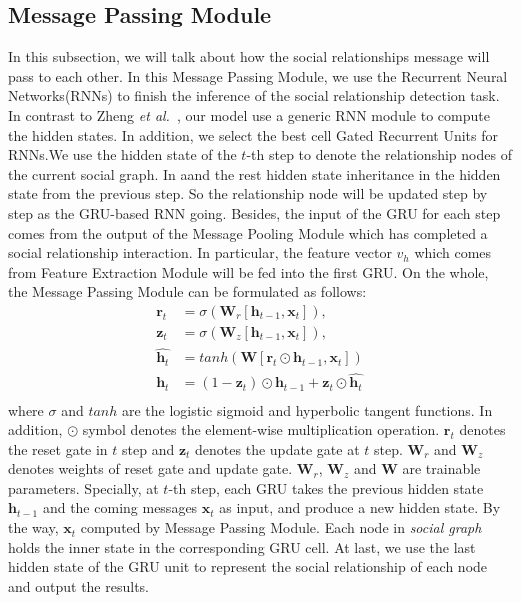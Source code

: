 \documentclass{article}
\newcommand{\etal}{{\it et al.}}
\begin{document}
\subsection{Message Passing Module} \label{section:RRNN}
In this subsection, we will talk about how the social relationships message will pass to each other.
In this Message Passing Module, we use the Recurrent Neural Networks(RNNs) to finish the inference of the social relationship detection task. In contrast to Zheng \etal \ \cite{DBLP:conf/iccv/0001JRVSDHT15}, our model use a generic RNN module to compute the hidden states. In addition, we select the best cell Gated Recurrent Units \cite{DBLP:conf/ssst/ChoMBB14} for RNNs.We use the hidden state of the $t$-th step to denote the relationship nodes of the current social graph. In aand the rest hidden state inheritance in the hidden state from the previous step. So the relationship node will be updated step by step as the GRU-based RNN going. Besides, the input of the GRU for each step comes from the output of the Message Pooling Module which has completed a social relationship interaction. In particular, the feature vector $v_h$ which comes from Feature Extraction Module will be fed into the first GRU. On the whole, the Message Passing Module can be formulated as follows:
\begin{equation}
\begin{split}
\bm{r}_t &=  \sigma(\bm{W}_{r}[\bm{h}_{t-1}, \bm{x}_t]), \\
\bm{z}_t &=  \sigma(\bm{W}_{z}[\bm{h}_{t-1}, \bm{x}_t]), \\
\hat{\bm{h}_t} &= tanh(\bm{W}[\bm{r}_t \odot \bm{h}_{t-1}, \bm{x}_{t}])\\
\bm{h}_t &= (1 - \bm{z}_t) \odot \bm{h}_{t - 1} + \bm{z}_t \odot \hat{\bm{h}_t} \\
\end{split}
\end{equation}
where $\sigma$ and $tanh$ are the logistic sigmoid and hyperbolic tangent functions. In addition, $\odot$ symbol denotes the element-wise multiplication operation. $\bm{r}_t$ denotes the reset gate in $t$ step and $\bm{z}_t$ denotes the update gate at $t$ step. $\bm{W}_r$ and $\bm{W}_z$ denotes weights of reset gate and update gate. $\bm{W}_r$, $\bm{W}_z$ and $\bm{W}$ are trainable parameters. Specially, at $t$-th step, each GRU takes the previous hidden state $\bm{h}_{t-1}$ and the coming messages $\bm{x}_{t}$ as input, and produce a new hidden state. By the way, $\bm{x}_t$ computed by Message Passing Module. Each node in \emph{social graph} holds the inner state in the corresponding GRU cell. At last, we use the last hidden state of the GRU unit to represent the social relationship of each node and output the results.
\end{document}

